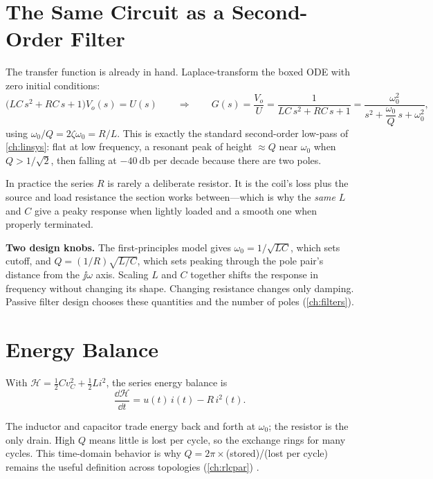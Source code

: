 \section{The Same Circuit as a Second-Order Filter}
\label{sec:lc-lowpass}
The transfer function is already in hand. Laplace-transform the boxed ODE with zero
initial conditions:
\[
\bigl(LC\,s^2+RC\,s+1\bigr)V_o(s)=U(s)
\qquad\Longrightarrow\qquad
G(s)=\frac{V_o}{U}=\frac{1}{LC\,s^2+RC\,s+1}
=\frac{\omega_0^2}{s^2+\dfrac{\omega_0}{Q}\,s+\omega_0^2},
\]
using \(\omega_0/Q=2\zeta\omega_0=R/L\). This is exactly the standard second-order
low-pass of \cref{ch:linsys}: flat at low frequency, a resonant peak of height
\(\approx Q\) near \(\omega_0\) when \(Q>1/\sqrt2\), then falling at
\(-\SI{40}{\decibel}\) per decade because there are two poles.

In practice the series \(R\) is rarely a deliberate resistor. It is the coil's loss
plus the source and load resistance the section works between---which is why the
\emph{same} \(L\) and \(C\) give a peaky response when lightly loaded and a smooth
one when properly terminated.

\begin{controlsbox}
\textbf{Two design knobs.} The first-principles model gives
\(\omega_0=1/\sqrt{LC}\), which sets cutoff, and
\(Q=(1/R)\sqrt{L/C}\), which sets peaking through the pole pair's distance from
the \(\jj\omega\) axis. Scaling \(L\) and \(C\) together shifts the response in
frequency without changing its shape. Changing resistance changes only damping.
Passive filter design chooses these quantities and the number of poles
(\cref{ch:filters}).
\end{controlsbox}

\section{Energy Balance}
With \(\mathcal{H}=\tfrac12 Cv_C^2+\tfrac12 Li^2\), the series energy balance is
\[
\frac{\dd\mathcal{H}}{\dd t}=u(t)\,i(t)-R\,i^2(t).
\]
\begin{energybox}
The inductor and capacitor trade energy back and forth at \(\omega_0\); the resistor
is the only drain. High \(Q\) means little is lost per cycle, so the exchange rings
for many cycles. This time-domain behavior is why
\(Q=2\pi\times\)(stored)/(lost per cycle) remains the useful definition across
topologies (\cref{ch:rlcpar}) \cite[pp.~187--191]{weber2001microwave}.
\end{energybox}

